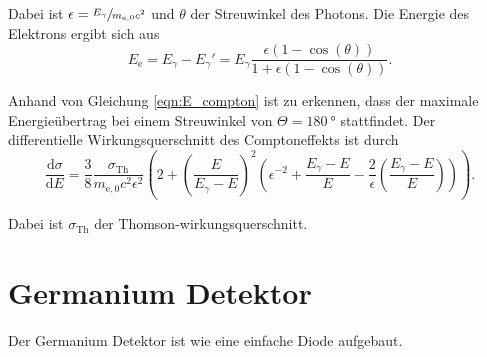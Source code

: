 Dabei ist $\epsilon = \sfrac{E_{\gamma}}{m_{\mathrm{e,0}}c^2}$ und $\theta$ der Streuwinkel des Photons. Die Energie des Elektrons ergibt sich aus 
\begin{equation}
    \label{eqn:E_elek_compton}
    E_\mathrm{e} = E_{\gamma} - E_{\gamma}' = E_{\gamma}\frac{\epsilon(1-\cos(\theta))}{1+\epsilon(1-\cos(\theta))}.
\end{equation}

Anhand von Gleichung \ref{eqn:E_compton} ist zu erkennen, dass der maximale Energieübertrag bei einem Streuwinkel von $\Theta = \qty{180}{\degree}$ stattfindet.
Der differentielle Wirkungsquerschnitt des Comptoneffekts ist durch 
\begin{equation}
    \label{eqn:WQ_compton}
    \frac{\mathrm{d}\sigma}{\mathrm{d}E} = \frac{3}{8}\frac{\sigma_\mathrm{Th}}{m_{\mathrm{e,0}}c^2\epsilon^2}\left(2+\left(\frac{E}{E_{\gamma} - E}\right)^2\left(\epsilon^{-2}+\frac{E_{\gamma} - E}{E}-\frac{2}{\epsilon}\left(\frac{E_{\gamma} - E}{E}\right)\right)\right).
\end{equation}

Dabei ist $\sigma_\mathrm{Th}$ der Thomson-wirkungsquerschnitt.

\section{Germanium Detektor}
\label{sec:germanium_detektor}
Der Germanium Detektor ist wie eine einfache Diode aufgebaut. 
